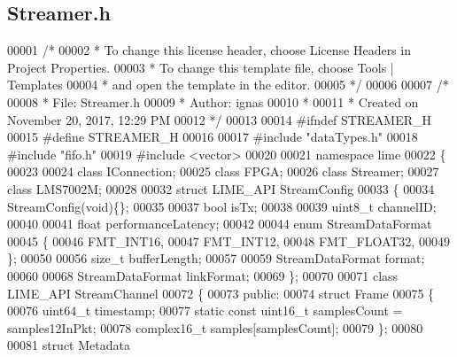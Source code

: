 \subsection{Streamer.\+h}
\label{Streamer_8h_source}

\begin{DoxyCode}
00001 \textcolor{comment}{/*}
00002 \textcolor{comment}{ * To change this license header, choose License Headers in Project Properties.}
00003 \textcolor{comment}{ * To change this template file, choose Tools | Templates}
00004 \textcolor{comment}{ * and open the template in the editor.}
00005 \textcolor{comment}{ */}
00006 
00007 \textcolor{comment}{/* }
00008 \textcolor{comment}{ * File:   Streamer.h}
00009 \textcolor{comment}{ * Author: ignas}
00010 \textcolor{comment}{ *}
00011 \textcolor{comment}{ * Created on November 20, 2017, 12:29 PM}
00012 \textcolor{comment}{ */}
00013 
00014 \textcolor{preprocessor}{#ifndef STREAMER\_H}
00015 \textcolor{preprocessor}{#define STREAMER\_H}
00016 
00017 \textcolor{preprocessor}{#include "dataTypes.h"}
00018 \textcolor{preprocessor}{#include "fifo.h"}
00019 \textcolor{preprocessor}{#include <vector>}
00020 
00021 \textcolor{keyword}{namespace }lime
00022 \{
00023    
00024 \textcolor{keyword}{class }IConnection;
00025 \textcolor{keyword}{class }FPGA;
00026 \textcolor{keyword}{class }Streamer;
00027 \textcolor{keyword}{class }LMS7002M;
00028 
00032 \textcolor{keyword}{struct }LIME_API StreamConfig
00033 \{
00034     StreamConfig(\textcolor{keywordtype}{void})\{\};
00035 
00037     \textcolor{keywordtype}{bool} isTx;
00038 
00039     uint8\_t channelID;
00040 
00041     \textcolor{keywordtype}{float} performanceLatency;
00042 
00044     \textcolor{keyword}{enum} StreamDataFormat
00045     \{
00046         FMT_INT16,
00047         FMT_INT12,
00048         FMT_FLOAT32,
00049     \};
00050 
00056     \textcolor{keywordtype}{size\_t} bufferLength;
00057 
00059     StreamDataFormat format;
00060 
00068     StreamDataFormat linkFormat;
00069 \};
00070 
00071 \textcolor{keyword}{class }LIME_API StreamChannel 
00072 \{
00073 \textcolor{keyword}{public}:
00074     \textcolor{keyword}{struct }Frame
00075     \{
00076         uint64\_t timestamp;
00077         \textcolor{keyword}{static} \textcolor{keyword}{const} uint16\_t samplesCount = samples12InPkt;
00078         complex16_t samples[samplesCount];
00079     \};
00080     
00081     \textcolor{keyword}{struct }Metadata

\end{DoxyCode}
